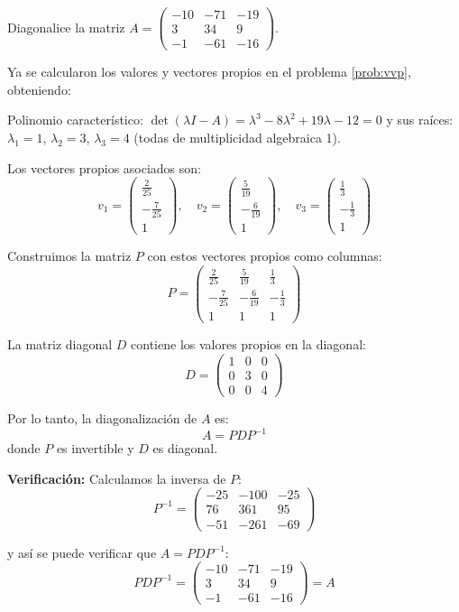 \begin{example}
Diagonalice la matriz $A=\left(\begin{matrix}
-10 & -71 & -19 \\
3 & 34 & 9 \\
-1 & -61 & -16
\end{matrix}\right).$
\begin{myproof}
Ya se calcularon los valores y vectores propios en el problema \ref{prob:vvp}, obteniendo:

Polinomio característico: $\det(\lambda I - A) = \lambda^3 - 8\lambda^2 + 19\lambda - 12 = 0$ y sus raíces: $\lambda_1=1$, $\lambda_2=3$, $\lambda_3=4$ (todas de multiplicidad algebraica 1).

Los vectores propios asociados son:
\[
v_1 = \begin{pmatrix} \frac{2}{25} \\ -\frac{7}{25} \\ 1 \end{pmatrix}, \quad
v_2 = \begin{pmatrix} \frac{5}{19} \\ -\frac{6}{19} \\ 1 \end{pmatrix}, \quad
v_3 = \begin{pmatrix} \frac{1}{3} \\ -\frac{1}{3} \\ 1 \end{pmatrix}
\]

Construimos la matriz $P$ con estos vectores propios como columnas:
\[
P = \begin{pmatrix}
\frac{2}{25} & \frac{5}{19} & \frac{1}{3} \\
-\frac{7}{25} & -\frac{6}{19} & -\frac{1}{3} \\
1 & 1 & 1
\end{pmatrix}
\]

La matriz diagonal $D$ contiene los valores propios en la diagonal:
\[
D = \begin{pmatrix}
1 & 0 & 0 \\
0 & 3 & 0 \\
0 & 0 & 4
\end{pmatrix}
\]

Por lo tanto, la diagonalización de $A$ es:
\[
A = P D P^{-1}
\]
donde $P$ es invertible y $D$ es diagonal.

\textbf{Verificación:} Calculamos la inversa de \(P\):
\[
P^{-1} = \begin{pmatrix}
-25 & -100 & -25 \\
76 & 361 & 95 \\
-51 & -261 & -69
\end{pmatrix}
\]

y así se puede verificar que \(A = P D P^{-1}\):
\[
P D P^{-1} = \begin{pmatrix}
-10 & -71 & -19 \\
3 & 34 & 9 \\
-1 & -61 & -16
\end{pmatrix} = A
\]
\end{myproof}
\end{example}






